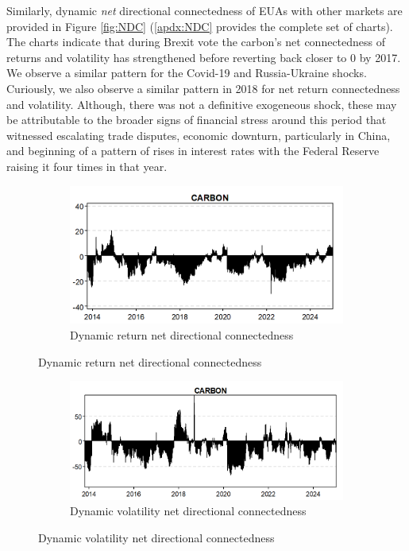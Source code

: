 \documentclass[preprint, 3p,
authoryear]{elsarticle} %
\begin{document}
Similarly, dynamic \textit{net} directional connectedness of EUAs with
other markets are provided in Figure \ref{fig:NDC} (\ref{apdx:NDC}
provides the complete set of charts). The charts indicate that during
Brexit vote the carbon's net connectedness of returns and volatility has
strengthened before reverting back closer to 0 by 2017. We observe a
similar pattern for the Covid-19 and Russia-Ukraine shocks. Curiously,
we also observe a similar pattern in 2018 for net return connectedness
and volatility. Although, there was not a definitive exogeneous shock,
these may be attributable to the broader signs of financial stress
around this period that witnessed escalating trade disputes, economic
downturn, particularly in China, and beginning of a pattern of rises in
interest rates with the Federal Reserve raising it four times in that
year.

\begin{figure}[!htb]
  \caption{Net Directional Connectedness between EUAs and other markets (Jan 2013 – Jan 2025)}
  \label{fig:NDC}
    \centering
      \begin{subfigure}[b]{\textwidth}
        \caption{Dynamic return net directional connectedness}
        \label{fig:dynretNDC}
        \centering
        \includegraphics[width = 0.75\linewidth]{3aDynRetNDC}
      \end{subfigure}
\end{figure}
\begin{figure}[!htb]
\ContinuedFloat
      \begin{subfigure}[b]{\textwidth}
        \caption{Dynamic volatility net directional connectedness}
        \label{fig:dynvolNDC}
        \centering
        \includegraphics[width = 0.75\linewidth]{3bDynVolNDC}
      \end{subfigure}
\end{figure}
\end{document}
